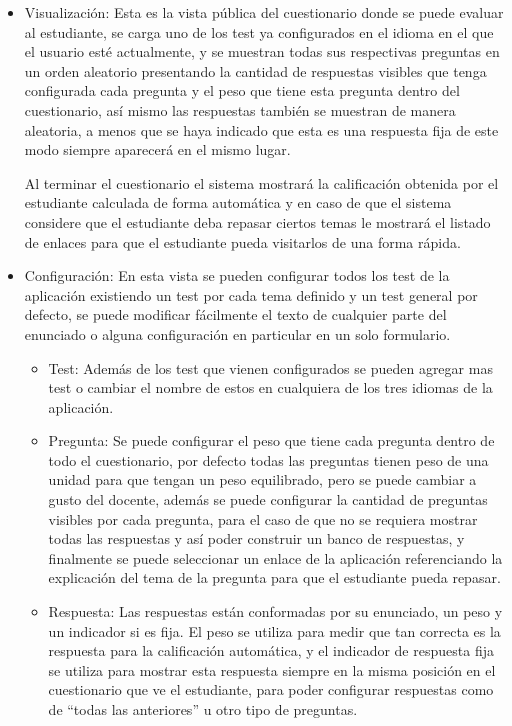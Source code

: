\documentclass[letterpaper, 11pt, oneside]{article}
\theoremstyle{definition}
\theoremstyle{remark}
\begin{document}
\begin{itemize}
  \item Visualización: Esta es la vista pública del cuestionario donde se puede evaluar al estudiante, se carga uno de los test ya configurados en el idioma en el que el usuario esté actualmente, y se muestran todas sus respectivas preguntas en un orden aleatorio presentando la cantidad de respuestas visibles que tenga configurada cada pregunta y el peso que tiene esta pregunta dentro del cuestionario, así mismo las respuestas también se muestran de manera aleatoria, a menos que se haya indicado que esta es una respuesta fija de este modo siempre aparecerá en el mismo lugar.

  Al terminar el cuestionario el sistema mostrará la calificación obtenida por el estudiante calculada de forma automática y en caso de que el sistema considere que el estudiante deba repasar ciertos temas le mostrará el listado de enlaces para que el estudiante pueda visitarlos de una forma rápida.
  \item Configuración: En esta vista se pueden configurar todos los test de la aplicación existiendo un test por cada tema definido y un test general por defecto, se puede modificar fácilmente el texto de cualquier parte del enunciado o alguna configuración en particular en un solo formulario.

  \begin{itemize}
    \item Test: Además de los test que vienen configurados se pueden agregar mas test o cambiar el nombre de estos en cualquiera de los tres idiomas de la aplicación.
    \item Pregunta: Se puede configurar el peso que tiene cada pregunta dentro de todo el cuestionario, por defecto todas las preguntas tienen peso de una unidad para que tengan un peso equilibrado, pero se puede cambiar a gusto del docente, además se puede configurar la cantidad de preguntas visibles por cada pregunta, para el caso de que no se requiera mostrar todas las respuestas y así poder construir un banco de respuestas, y finalmente se puede seleccionar un enlace de la aplicación referenciando la explicación del tema de la pregunta para que el estudiante pueda repasar.
    \item Respuesta: Las respuestas están conformadas por su enunciado, un peso y un indicador si es fija. El peso se utiliza para medir que tan correcta es la respuesta para la calificación automática, y el indicador de respuesta fija se utiliza para mostrar esta respuesta siempre en la misma posición en el cuestionario que ve el estudiante, para poder configurar respuestas como de “todas las anteriores” u otro tipo de preguntas.
  \end{itemize}  
\end{itemize}
 
\end{document}
